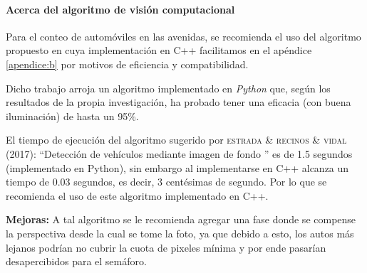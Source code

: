 \paragraph{Acerca del algoritmo de visión computacional}
Para el conteo de automóviles en las avenidas, se recomienda el uso del algoritmo propuesto en \cite{ittap} cuya implementación en C++ facilitamos en el apéndice \ref{apendice:b}  por motivos de eficiencia y compatibilidad. 

Dicho trabajo arroja un algoritmo implementado en \emph{Python} que, según los resultados de la propia investigación, ha probado tener una eficacia (con buena iluminación) de hasta un 95\%.

El tiempo de ejecución del algoritmo sugerido por \textsc{estrada \& recinos \& vidal (2017)}: ``Detección de vehículos mediante imagen de fondo '' es de 1.5 segundos (implementado en Python), sin embargo al implementarse en C++ alcanza un tiempo de 0.03 segundos, es decir, 3 centésimas de segundo. Por lo que se recomienda el uso de este algoritmo implementado en C++.

\textbf{Mejoras:} A tal algoritmo se le recomienda agregar una fase donde se compense la perspectiva desde la cual se tome la foto, ya que debido a esto, los autos más lejanos podrían no cubrir la cuota de pixeles mínima y por ende pasarían desapercibidos para el semáforo.
